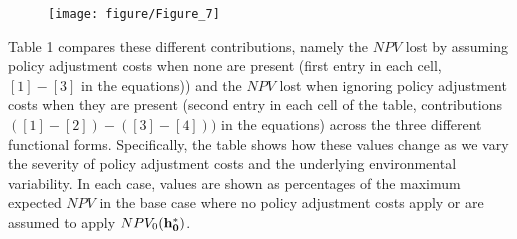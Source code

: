 \documentclass{article}\usepackage{graphicx, color}
\newenvironment{knitrout}{}{} %
\begin{document}
\begin{figure}
\begin{knitrout}
\color{fgcolor}
\texttt{[image: figure/Figure\_7]} 

\end{knitrout}

\end{figure}




Table 1 compares these different contributions, namely the $NPV$ lost by assuming policy adjustment costs when none are present (first entry in each cell, $[1]-[3]$ in the equations)) and the $NPV$ lost when ignoring policy adjustment costs when they are present (second entry in each cell of the table, contributions $([1]-[2])-([3]-[4]))$ in the equations) across the three different functional forms. Specifically, the table shows how these values change as we vary the severity of policy adjustment costs and the underlying environmental variability. In each case, values are shown as percentages of the maximum expected $NPV$ in the base case where no policy adjustment costs apply or are assumed to apply $NPV_0({\bf h_0^*})$.
\end{document}
